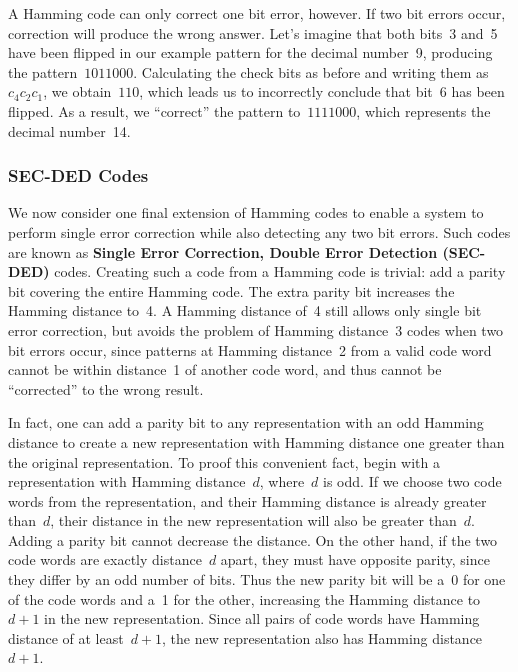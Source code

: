 A Hamming code can only correct one bit error, however.  If two bit
errors occur, correction will produce the wrong answer.  Let's imagine
that both bits~3 and~5 have been flipped in our example pattern for
the decimal number~9, producing the pattern~$1011000$.  Calculating the
check bits as before and writing them as~$c_4c_2c_1$, we obtain~$110$,
which leads us to incorrectly conclude that bit~6 has been flipped.
As a result, we ``correct'' the pattern to~$1111000$, which represents
the decimal number~14.\\


\subsubsection{SEC-DED Codes}

We now consider one final extension of Hamming codes to enable a system
to perform single error correction while also detecting any two bit errors.
Such codes are known as {\bf Single Error Correction, Double Error 
Detection (SEC-DED)} codes.  Creating such a code from a Hamming code is
trivial: add a parity bit covering the entire Hamming code.  The extra
parity bit increases the Hamming distance to~4.  A Hamming distance of~4
still allows only single bit error correction, but avoids the problem
of Hamming distance~3 codes when two bit errors occur, since patterns
at Hamming distance~2 from a valid code word cannot be within distance~1
of another code word, and thus cannot be ``corrected'' to the wrong
result.

In fact, one can add a parity bit to any representation with an odd
Hamming distance to create a new representation with Hamming distance
one greater than the original representation.  To proof this convenient
fact, begin with a representation with Hamming distance~$d$, where~$d$
is odd.  If we choose two code words from the representation, and their 
Hamming distance is already greater than~$d$, their distance in the 
new representation will also be greater than~$d$.  Adding a parity
bit cannot decrease the distance.  On the other hand, if the two code
words are exactly distance~$d$ apart, they must have opposite parity,
since they differ by an odd number of bits.  Thus the new parity bit
will be a~0 for one of the code words and a~1 for the other, increasing
the Hamming distance to~$d+1$ in the new representation.  Since all
pairs of code words have Hamming distance of at least~$d+1$, the
new representation also has Hamming distance~$d+1$.

\vfill

\pagebreak

